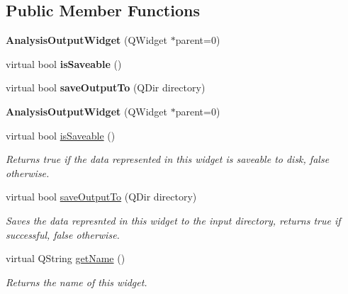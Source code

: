 \subsection*{Public Member Functions}
\begin{DoxyCompactItemize}
\item 
\hypertarget{class_picto_1_1_analysis_output_widget_a1cb5d5b9b1b9f22b4571577c89327d4f}{{\bfseries Analysis\-Output\-Widget} (Q\-Widget $\ast$parent=0)}\label{class_picto_1_1_analysis_output_widget_a1cb5d5b9b1b9f22b4571577c89327d4f}

\item 
\hypertarget{class_picto_1_1_analysis_output_widget_a9cdc9a514cdbeaaf747654cae6215bf5}{virtual bool {\bfseries is\-Saveable} ()}\label{class_picto_1_1_analysis_output_widget_a9cdc9a514cdbeaaf747654cae6215bf5}

\item 
\hypertarget{class_picto_1_1_analysis_output_widget_a02b8a713faebd966c1a72565de9eb73d}{virtual bool {\bfseries save\-Output\-To} (Q\-Dir directory)}\label{class_picto_1_1_analysis_output_widget_a02b8a713faebd966c1a72565de9eb73d}

\item 
\hypertarget{class_picto_1_1_analysis_output_widget_a2f337434edfed55fa23ab974bad399c9}{{\bfseries Analysis\-Output\-Widget} (Q\-Widget $\ast$parent=0)}\label{class_picto_1_1_analysis_output_widget_a2f337434edfed55fa23ab974bad399c9}

\item 
\hypertarget{class_picto_1_1_analysis_output_widget_a9cdc9a514cdbeaaf747654cae6215bf5}{virtual bool \hyperlink{class_picto_1_1_analysis_output_widget_a9cdc9a514cdbeaaf747654cae6215bf5}{is\-Saveable} ()}\label{class_picto_1_1_analysis_output_widget_a9cdc9a514cdbeaaf747654cae6215bf5}

\begin{DoxyCompactList}\small\item\em Returns true if the data represented in this widget is saveable to disk, false otherwise. \end{DoxyCompactList}\item 
\hypertarget{class_picto_1_1_analysis_output_widget_a02b8a713faebd966c1a72565de9eb73d}{virtual bool \hyperlink{class_picto_1_1_analysis_output_widget_a02b8a713faebd966c1a72565de9eb73d}{save\-Output\-To} (Q\-Dir directory)}\label{class_picto_1_1_analysis_output_widget_a02b8a713faebd966c1a72565de9eb73d}

\begin{DoxyCompactList}\small\item\em Saves the data represnted in this widget to the input directory, returns true if successful, false otherwise. \end{DoxyCompactList}\item 
virtual Q\-String \hyperlink{class_picto_1_1_analysis_output_widget_ab41bc2f661ea3d7afc2fef6774019efb}{get\-Name} ()
\begin{DoxyCompactList}\small\item\em Returns the name of this widget. \end{DoxyCompactList}\end{DoxyCompactItemize}


